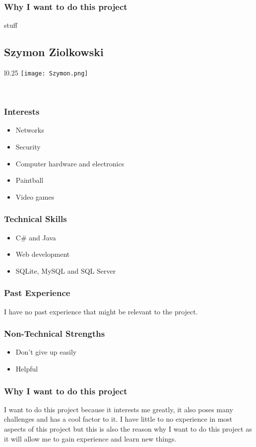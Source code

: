 \subsubsection{Why I want to do this project} stuff


\subsection{Szymon Ziolkowski}
\begin{wrapfigure}[5]{l}{0.25\textwidth}
\vspace{10pt}
\texttt{[image: Szymon.png]}
\end{wrapfigure}

\textcolor{white}{.}
\subsubsection{Interests}
	\begin{itemize}
		\item Networks
		\item Security
		\item Computer hardware and electronics
		\item Paintball
		\item Video games
	\end{itemize}
\subsubsection{Technical Skills} 
	\begin{itemize}
		\item C\# and Java
		\item Web development
		\item SQLite, MySQL and SQL Server
	\end{itemize}
\subsubsection{Past Experience}
I have no past experience that might be relevant to the project. %
\subsubsection{Non-Technical Strengths}
	\begin{itemize}
		\item Don't give up easily
		\item Helpful
	\end{itemize}
\subsubsection{Why I want to do this project} 
I want to do this project because it interests me greatly, it also poses many challenges and has a cool factor to it. I have little to no experience in most aspects of this project but this is also the reason why I want to do this project as it will allow me to gain experience and learn new things. 


